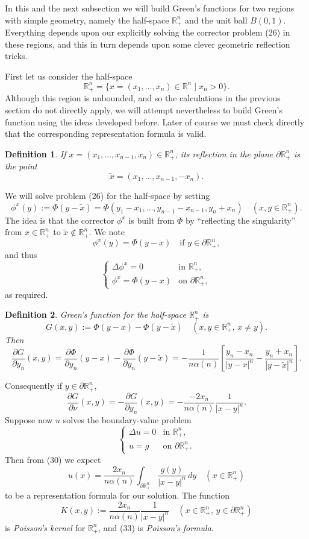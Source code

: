 \documentclass[a4paper,12pt]{report}
\newtheorem{definition}{Definition}[section]
\begin{document}
\noindent
In this and the next subsection we will build Green’s functions for two regions with simple geometry, namely the half-space \( \mathbb{R}^n_+ \) and the unit ball \( B(0, 1) \). Everything depends upon our explicitly solving the corrector problem (26) in these regions, and this in turn depends upon some clever geometric reflection tricks.

First let us consider the half-space
\[
\mathbb{R}^n_+ = \{ x = (x_1, \dots, x_n) \in \mathbb{R}^n \mid x_n > 0 \}.
\]
Although this region is unbounded, and so the calculations in the previous section do not directly apply, we will attempt nevertheless to build Green’s function using the ideas developed before. Later of course we must check directly that the corresponding representation formula is valid.
\begin{definition}
If \( x = (x_1, \dots, x_{n-1}, x_n) \in \mathbb{R}^n_+ \), its reflection \textit{in the plane} \( \partial \mathbb{R}^n_+ \) is the point
\[
\tilde{x} = (x_1, \dots, x_{n-1}, -x_n).
\]
\end{definition}
We will solve problem (26) for the half-space by setting
\[
\phi^x(y) := \Phi(y - \tilde{x}) = \Phi(y_1 - x_1, \dots, y_{n-1} - x_{n-1}, y_n + x_n) \quad (x, y \in \mathbb{R}^n_+).
\]
The idea is that the corrector \( \phi^x \) is built from \( \Phi \) by ``reflecting the singularity'' from \( x \in \mathbb{R}^n_+ \) to \( \tilde{x} \notin \mathbb{R}^n_+ \). We note
\[
\phi^x(y) = \Phi(y - x) \quad \text{if } y \in \partial \mathbb{R}^n_+,
\]
and thus
\[
\begin{cases}
\Delta \phi^x = 0 & \text{in } \mathbb{R}^n_+, \\
\phi^x = \Phi(y - x) & \text{on } \partial \mathbb{R}^n_+,
\end{cases}
\]
as required.
\begin{definition}
Green's function for the half-space \( \mathbb{R}^n_+ \) is
\[
G(x, y) := \Phi(y - x) - \Phi(y - \tilde{x}) \quad (x, y \in \mathbb{R}^n_+, \, x \neq y).
\]
Then
\[
\frac{\partial G}{\partial y_n} (x, y) = \frac{\partial \Phi}{\partial y_n} (y - x) - \frac{\partial \Phi}{\partial y_n} (y - \tilde{x})
= -\frac{1}{n \alpha(n)} \left[ \frac{y_n - x_n}{|y - x|^n} - \frac{y_n + x_n}{|y - \tilde{x}|^n} \right].
\]
\end{definition}
Consequently if \( y \in \partial \mathbb{R}^n_+ \),
\[
\frac{\partial G}{\partial \nu} (x, y) = -\frac{\partial G}{\partial y_n} (x, y) = -\frac{-2x_n}{n \alpha(n)} \frac{1}{|x - y|^n}.
\]
Suppose now \( u \) solves the boundary-value problem
\[
\begin{cases}
\Delta u = 0 & \text{in } \mathbb{R}^n_+, \\
u = g & \text{on } \partial \mathbb{R}^n_+.
\end{cases} \tag{32}
\]
Then from (30) we expect
\[
u(x) = \frac{2x_n}{n \alpha(n)} \int_{\partial \mathbb{R}^n_+} \frac{g(y)}{|x - y|^n} \, dy \quad (x \in \mathbb{R}^n_+) \tag{33}
\]
to be a representation formula for our solution. The function
\[
K(x, y) := \frac{2x_n}{n \alpha(n)} \frac{1}{|x - y|^n} \quad (x \in \mathbb{R}^n_+, \, y \in \partial \mathbb{R}^n_+)
\]
is \textit{Poisson's kernel} for \( \mathbb{R}^n_+ \), and (33) is \textit{Poisson's formula}.
\end{document}

